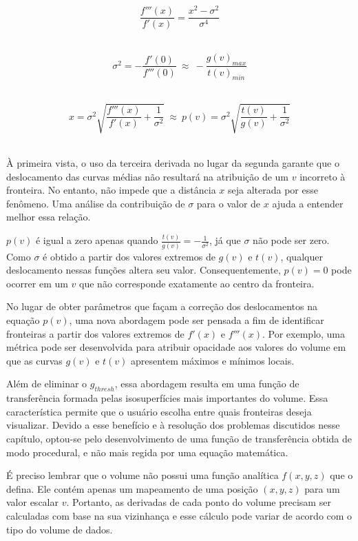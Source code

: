 \begin{equation} \label{eq:sigmax}
	\frac{f'''(x)}{f'(x)} = \frac{x^{2} - \sigma^{2}}{\sigma^{4}}
\end{equation} \

\begin{equation} \label{eq:sigma3}
	\sigma^{2} = -\frac{f'(0)}{f'''(0)} \ \approx \ -\frac{g(v)_{max}}{t(v)_{min}}
\end{equation} \

\begin{equation} \label{eq:x3}
	x = \sigma^{2}\sqrt{\frac{f'''(x)}{f'(x)} + \frac{1}{\sigma^{2}}} \ \approx \ 
	p(v) = \sigma^{2}\sqrt{\frac{t(v)}{g(v)} + \frac{1}{\sigma^{2}}}
\end{equation} \

	À primeira vista, o uso da terceira derivada no lugar da segunda garante que o deslocamento das curvas médias não resultará na atribuição de um $ v $ incorreto à fronteira. No entanto, não impede que a distância $ x $ seja alterada por esse fenômeno. Uma análise da contribuição de $ \sigma $ para o valor de $ x $ ajuda a entender melhor essa relação.
	
	$ p(v) $ é igual a zero apenas quando $ \frac{t(v)}{g(v)} = -\frac{1}{\sigma^{2}} $, já que $ \sigma $ não pode ser zero. Como $ \sigma $ é obtido a partir dos valores extremos de $ g(v) $ e $ t(v) $, qualquer deslocamento nessas funções altera seu valor. Consequentemente, $ p(v) = 0 $ pode ocorrer em um $ v $ que não corresponde exatamente ao centro da fronteira.
	
	No lugar de obter parâmetros que façam a correção dos deslocamentos na equação $ p(v) $, uma nova abordagem pode ser pensada a fim de identificar fronteiras a partir dos valores extremos de $ f'(x) $ e $ f'''(x) $. Por exemplo, uma métrica pode ser desenvolvida para atribuir opacidade aos valores do volume em que as curvas $ g(v) $ e $ t(v) $ apresentem máximos e mínimos locais.
	
	Além de eliminar o $ g_{thresh} $, essa abordagem resulta em uma função de transferência formada pelas isosuperfícies mais importantes do volume. Essa característica permite que o usuário escolha entre quais fronteiras deseja visualizar. Devido a esse benefício e à resolução dos problemas discutidos nesse capítulo, optou-se pelo desenvolvimento de uma função de transferência obtida de modo procedural, e não mais regida por uma equação matemática.
	
	É preciso lembrar que o volume não possui uma função analítica $ f(x, y, z) $ que o defina. Ele contém apenas um mapeamento de uma posição $ (x, y, z) $ para um valor escalar $ v $. Portanto, as derivadas de cada ponto do volume precisam ser calculadas com base na sua vizinhança e esse cálculo pode variar de acordo com o tipo do volume de dados.
	

